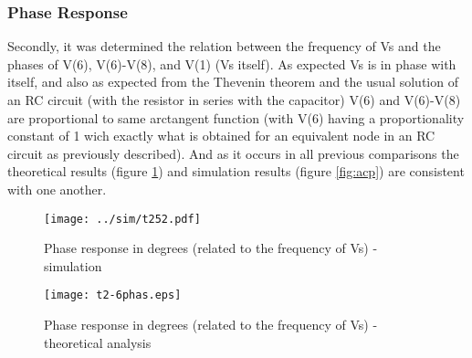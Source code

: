 
\subsubsection{Phase Response}

Secondly, it was determined the relation between the frequency of Vs and the phases of V(6), V(6)-V(8), and V(1) (Vs itself). As expected Vs is in phase with itself, and also as expected from the Thevenin theorem and the usual solution of an RC circuit (with the resistor in series with the capacitor) V(6) and V(6)-V(8) are proportional to same arctangent function (with V(6) having a proportionality constant of 1 wich exactly what is obtained for an equivalent node in an RC circuit as previously described). And as it occurs in all previous comparisons the theoretical results (figure \ref{fig:comphas}) and simulation results (figure \ref{fig:acp}) are consistent with one another.

\begin{figure}[h] \centering
  \begin{minipage}{.5\textwidth}
    \texttt{[image: ../sim/t252.pdf]}
    \caption{Phase response in degrees (related to the frequency of Vs) - simulation}
    \label{fig:acp}
    \end{minipage}%
  \begin{minipage}{.5\textwidth}
    \vspace{10mm}
  \centering
    \texttt{[image: t2-6phas.eps]}
    \caption{Phase response in degrees (related to the frequency of Vs) - theoretical analysis}
    \label{fig:comphas}
      \end{minipage}%
\end{figure}





